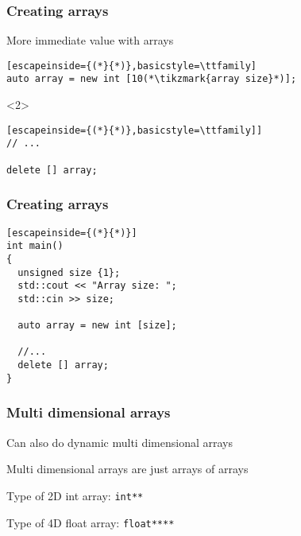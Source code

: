 \documentclass[14pt,a4paper,dvipsnames,usenames]{beamer}
\begin{document}
\begin{frame}[fragile]
  \frametitle{Creating arrays}

  More immediate value with arrays

  \vspace{1em}
  \begin{lstlisting}[escapeinside={(*}{*)},basicstyle=\ttfamily]
auto array = new int [10(*\tikzmark{array size}*)];
  \end{lstlisting}

  \begin{uncoverenv}<2>
  \vspace*{.5em}
  \begin{lstlisting}[escapeinside={(*}{*)},basicstyle=\ttfamily]]
// ...

delete [] array;
  \end{lstlisting} 
  \end{uncoverenv}

  
\end{frame}

\begin{frame}[fragile]
  \frametitle{Creating arrays}

  \begin{lstlisting}[escapeinside={(*}{*)}]
int main()
{
  unsigned size {1};
  std::cout << "Array size: ";
  std::cin >> size;

  auto array = new int [size];
  
  //...
  delete [] array;
}
  \end{lstlisting}

\end{frame}

\begin{frame}[fragile]
  \frametitle{Multi dimensional arrays}

  Can also do dynamic multi dimensional arrays

  \vspace{1em}
  Multi dimensional arrays are just arrays of arrays

  \vspace{.5em}
  Type of 2D {\color{FeebleWeek}int} array: \hspace{.5em} \lstinline!int**!

  \vspace{.5em}
  Type of 4D {\color{FeebleWeek}float} array: \hspace{.5em} \lstinline!float****!
  
\end{frame}
\end{document}
